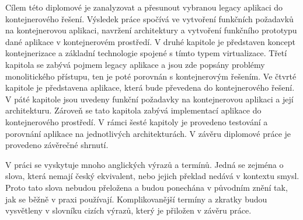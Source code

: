 Cílem této diplomové je zanalyzovat a přesunout vybranou legacy aplikaci do kontejnerového řešení. Výsledek práce spočívá ve vytvoření funkčních požadavků na kontejnerovou aplikaci, navržení architektury a vytvoření funkčního prototypu dané aplikace v kontejnerovém prostředí. V druhé kapitole je představen koncept kontejnerizace a základní technologie spojené s tímto typem virtualizace. Třetí kapitola se zabývá pojmem legacy aplikace a jsou zde popsány problémy monolitického přístupu, ten je poté porovnán s kontejnerovým řešením. Ve čtvrté kapitole je představena aplikace, která bude převedena do kontejnerového řešení. V páté kapitole jsou uvedeny funkční požadavky na kontejnerovou aplikaci a její architekturu. Zároveň se tato kapitola zabývá implementací aplikace do kontejnerového prostředí. V rámci šesté kapitoly je provedeno testování a porovnání aplikace na jednotlivých architekturách. V závěru diplomové práce je provedeno závěrečné shrnutí.

V práci se vyskytuje mnoho anglických výrazů a termínů. Jedná se zejména o slova, která nemají český ekvivalent, nebo jejich překlad nedává v kontextu smysl. Proto tato slova nebudou přeložena a budou ponechána v původním znění tak, jak se běžně v praxi používají. Komplikovanější termíny a zkratky budou vysvětleny v slovníku cizích výrazů, který je přiložen v závěru práce.